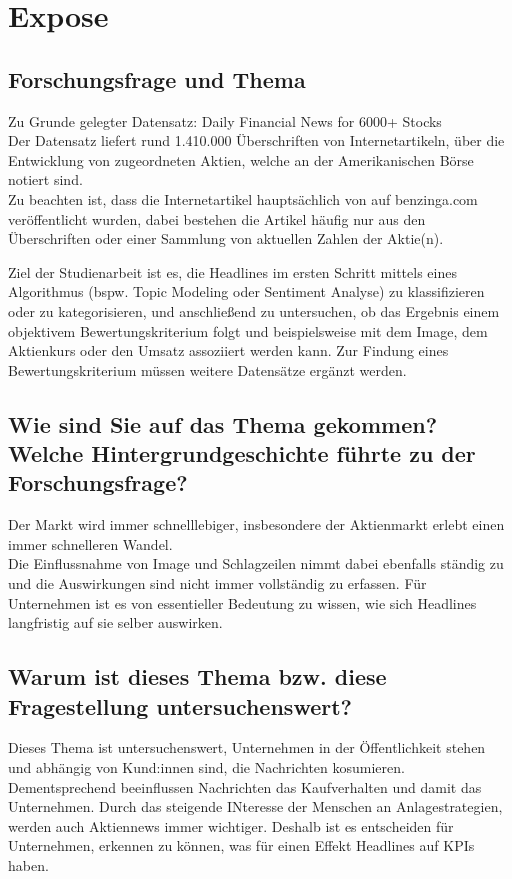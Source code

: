 \chapter*{Expose}
\section*{Forschungsfrage und Thema}

Zu Grunde gelegter Datensatz: 
Daily Financial News for 6000+ Stocks
\citep[see][]{dailyfinancialnews} \\
Der Datensatz liefert rund 1.410.000 Überschriften von Internetartikeln, über die Entwicklung von zugeordneten Aktien, welche an der Amerikanischen Börse notiert sind.\\
Zu beachten ist, dass die Internetartikel hauptsächlich von auf benzinga.com veröffentlicht wurden, dabei bestehen die Artikel häufig nur aus den Überschriften oder einer Sammlung von aktuellen Zahlen der Aktie(n).

Ziel der Studienarbeit ist es, die Headlines im ersten Schritt mittels eines Algorithmus (bspw. Topic Modeling oder Sentiment Analyse) zu klassifizieren oder zu kategorisieren, und anschließend zu untersuchen, ob das Ergebnis einem objektivem Bewertungskriterium folgt und beispielsweise mit dem Image, dem Aktienkurs oder den Umsatz assoziiert werden kann.
Zur Findung eines Bewertungskriterium müssen weitere Datensätze ergänzt werden.

\section*{Wie sind Sie auf das Thema gekommen? Welche Hintergrundgeschichte führte zu der Forschungsfrage?}
Der Markt wird immer schnelllebiger, insbesondere der Aktienmarkt erlebt einen immer schnelleren Wandel.\\
Die Einflussnahme von Image und Schlagzeilen nimmt dabei ebenfalls ständig zu und die Auswirkungen sind nicht immer vollständig zu erfassen.
Für Unternehmen ist es von essentieller Bedeutung zu wissen, wie sich Headlines langfristig auf sie selber auswirken. 

\section*{Warum ist dieses Thema bzw. diese Fragestellung untersuchenswert?}
Dieses Thema ist untersuchenswert, Unternehmen in der Öffentlichkeit stehen und abhängig von Kund:innen sind, die Nachrichten kosumieren. Dementsprechend beeinflussen Nachrichten das Kaufverhalten und damit das Unternehmen. Durch das steigende INteresse der Menschen an Anlagestrategien, werden auch Aktiennews immer wichtiger. Deshalb ist es entscheiden für Unternehmen, erkennen zu können, was für einen Effekt Headlines auf KPIs haben.

